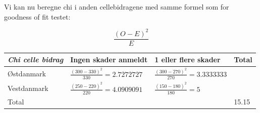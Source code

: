 \documentclass[]{book}
\begin{document}
Vi kan nu beregne chi i anden cellebidragene med samme formel som for goodness of fit testet:

\[\frac{(O-E)^2}{E}\]

\begin{longtable}[]{@{}llll@{}}
\toprule
\begin{minipage}[b]{0.09\columnwidth}\raggedright
\textbf{\emph{Chi celle bidrag}}\strut
\end{minipage} & \begin{minipage}[b]{0.23\columnwidth}\raggedright
Ingen skader anmeldt\strut
\end{minipage} & \begin{minipage}[b]{0.28\columnwidth}\raggedright
1 eller flere skader\strut
\end{minipage} & \begin{minipage}[b]{0.28\columnwidth}\raggedright
Total\strut
\end{minipage}\tabularnewline
\midrule
\endhead
\begin{minipage}[t]{0.09\columnwidth}\raggedright
Østdanmark\strut
\end{minipage} & \begin{minipage}[t]{0.23\columnwidth}\raggedright
\(\frac{(300-330)^2}{330}=2.7272727\)\strut
\end{minipage} & \begin{minipage}[t]{0.28\columnwidth}\raggedright
\(\frac{(300-270)^2}{270}=3.3333333\)\strut
\end{minipage} & \begin{minipage}[t]{0.28\columnwidth}\raggedright
\strut
\end{minipage}\tabularnewline
\begin{minipage}[t]{0.09\columnwidth}\raggedright
Vestdanmark\strut
\end{minipage} & \begin{minipage}[t]{0.23\columnwidth}\raggedright
\(\frac{(250-220)^2}{220}=4.0909091\)\strut
\end{minipage} & \begin{minipage}[t]{0.28\columnwidth}\raggedright
\(\frac{(150-180)^2}{180}=5\)\strut
\end{minipage} & \begin{minipage}[t]{0.28\columnwidth}\raggedright
\strut
\end{minipage}\tabularnewline
\begin{minipage}[t]{0.09\columnwidth}\raggedright
Total\strut
\end{minipage} & \begin{minipage}[t]{0.23\columnwidth}\raggedright
\strut
\end{minipage} & \begin{minipage}[t]{0.28\columnwidth}\raggedright
\strut
\end{minipage} & \begin{minipage}[t]{0.28\columnwidth}\raggedright
15.15\strut
\end{minipage}\tabularnewline
\bottomrule
\end{longtable}
\end{document}
